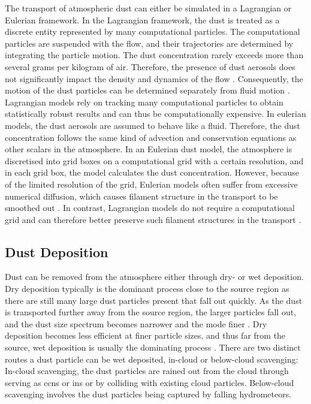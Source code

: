 The transport of atmospheric dust can either be simulated in a Lagrangian or Eulerian framework.
In the Lagrangian framework, the dust is treated as a discrete entity represented by many computational particles.
The computational particles are suspended with the flow, and their trajectories are determined by integrating the particle motion. 
The dust concentration rarely exceeds more than several grams per kilogram of air. Therefore, the presence of dust aerosols does not significantly impact the density and dynamics of the flow \parencite{zhuang2001compositions}. Consequently, the motion of the dust particles can be determined separately from fluid motion \parencite{ShaoYaping2008PaMo}.
Lagrangian models rely on tracking many computational particles to obtain statistically robust results and can thus be computationally expensive. In eulerian models, the dust aerosols are assumed to behave like a fluid. Therefore, the dust concentration follows the same kind of advection and conservation equations as other scalars in the atmosphere. 
In an Eulerian dust model, the atmosphere is discretised into grid boxes on a computational grid with a certain resolution, and in each grid box, the model calculates the dust concentration. However, because of the limited resolution of the grid, Eulerian models often suffer from excessive numerical diffusion, which causes filament structure in the transport to be smoothed out \parencite{cassiani_offline_2016}. 
In contrast, Lagrangian models do not require a computational grid and can therefore better preserve such filament structures in the transport \parencite{cassiani_offline_2016}.         

\subsection{Dust Deposition}
Dust can be removed from the atmosphere either through dry- or wet deposition. 
Dry deposition typically is the dominant process close to the source region as there are still many large dust particles present that fall out quickly. 
As the dust is transported further away from the source region, the larger particles fall out, and the dust size spectrum becomes narrower and the mode finer \parencite{does2016particle}.
Dry deposition becomes less efficient at finer particle sizes, and thus far from the source, wet deposition is usually the dominating process \parencite{zhao2003modeled}.
There are two distinct routes a dust particle can be wet deposited, in-cloud or below-cloud scavenging: 
In-cloud scavenging, the dust particles are rained out from the cloud through serving as \acrshort{ccn}s or \acrshort{in}s or by colliding with existing cloud particles. Below-cloud scavenging involves the dust particles being captured by falling hydrometeors. 

